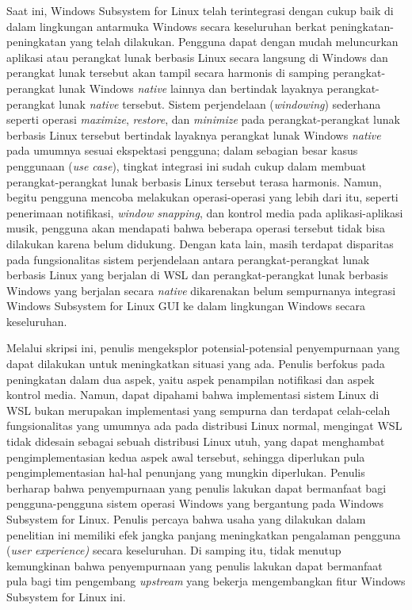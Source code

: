Saat ini, Windows Subsystem for Linux telah terintegrasi dengan cukup baik di dalam lingkungan antarmuka Windows secara keseluruhan berkat peningkatan-peningkatan yang telah dilakukan. Pengguna dapat dengan mudah meluncurkan aplikasi atau perangkat lunak berbasis Linux secara langsung di Windows dan perangkat lunak tersebut akan tampil secara harmonis di samping perangkat-perangkat lunak Windows \textit{native} lainnya dan bertindak layaknya perangkat-perangkat lunak \textit{native} tersebut. Sistem perjendelaan (\textit{windowing}) sederhana seperti operasi \textit{maximize}, \textit{restore}, dan \textit{minimize} pada perangkat-perangkat lunak berbasis Linux tersebut bertindak layaknya perangkat lunak Windows \textit{native} pada umumnya sesuai ekspektasi pengguna; dalam sebagian besar kasus penggunaan (\textit{use case}), tingkat integrasi ini sudah cukup dalam membuat perangkat-perangkat lunak berbasis Linux tersebut terasa harmonis. Namun, begitu pengguna mencoba melakukan operasi-operasi yang lebih dari itu, seperti penerimaan notifikasi, \textit{window snapping}, dan kontrol media pada aplikasi-aplikasi musik, pengguna akan mendapati bahwa beberapa operasi tersebut tidak bisa dilakukan karena belum didukung. Dengan kata lain, masih terdapat disparitas pada fungsionalitas sistem perjendelaan antara perangkat-perangkat lunak berbasis Linux yang berjalan di WSL dan perangkat-perangkat lunak berbasis Windows yang berjalan secara \textit{native} dikarenakan belum sempurnanya integrasi Windows Subsystem for Linux GUI ke dalam lingkungan Windows secara keseluruhan.

Melalui skripsi ini, penulis mengeksplor potensial-potensial penyempurnaan yang dapat dilakukan untuk meningkatkan situasi yang ada. Penulis berfokus pada peningkatan dalam dua aspek, yaitu aspek penampilan notifikasi dan aspek kontrol media. Namun, dapat dipahami bahwa implementasi sistem Linux di WSL bukan merupakan implementasi yang sempurna dan terdapat celah-celah fungsionalitas yang umumnya ada pada distribusi Linux normal, mengingat WSL tidak didesain sebagai sebuah distribusi Linux utuh, yang dapat menghambat pengimplementasian kedua aspek awal tersebut, sehingga diperlukan pula pengimplementasian hal-hal penunjang yang mungkin diperlukan. Penulis berharap bahwa penyempurnaan yang penulis lakukan dapat bermanfaat bagi pengguna-pengguna sistem operasi Windows yang bergantung pada Windows Subsystem for Linux. Penulis percaya bahwa usaha yang dilakukan dalam penelitian ini memiliki efek jangka panjang meningkatkan pengalaman pengguna (\textit{user experience)} secara keseluruhan. Di samping itu, tidak menutup kemungkinan bahwa penyempurnaan yang penulis lakukan dapat bermanfaat pula bagi tim pengembang \textit{upstream} yang bekerja mengembangkan fitur Windows Subsystem for Linux ini.

